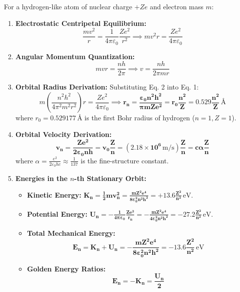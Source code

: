 \documentclass[10pt,a4paper]{article}
\begin{document}
\begin{formulabox}
For a hydrogen-like atom of nuclear charge $+Ze$ and electron mass $m$:
\begin{enumerate}
  \item \textbf{Electrostatic Centripetal Equilibrium:}
  \begin{equation}
    \frac{m v^2}{r} = \frac{1}{4\pi\varepsilon_0} \frac{Z e^2}{r^2} \implies m v^2 r = \frac{Z e^2}{4\pi\varepsilon_0} \tag{Eq. 1}
  \end{equation}
  \item \textbf{Angular Momentum Quantization:}
  \begin{equation}
    m v r = \frac{n h}{2\pi} \implies v = \frac{n h}{2\pi m r} \tag{Eq. 2}
  \end{equation}
  \item \textbf{Orbital Radius Derivation:} Substituting Eq. 2 into Eq. 1:
  \begin{equation}
    m \left(\frac{n^2 h^2}{4\pi^2 m^2 r^2}\right) r = \frac{Z e^2}{4\pi\varepsilon_0} \implies \mathbf{r_n = \frac{\varepsilon_0 n^2 h^2}{\pi m Z e^2} = r_0 \frac{n^2}{Z} = 0.529 \frac{n^2}{Z}\,\text{\AA}}
  \end{equation}
  where $r_0 = 0.529177\,\text{\AA}$ is the first Bohr radius of hydrogen ($n=1, Z=1$).
  \item \textbf{Orbital Velocity Derivation:}
  \begin{equation}
    \mathbf{v_n = \frac{Z e^2}{2\varepsilon_0 n h} = v_0 \frac{Z}{n} = \left(2.18 \times 10^6\,\mathrm{m/s}\right)\frac{Z}{n} = c \alpha \frac{Z}{n}}
  \end{equation}
  where $\alpha = \frac{e^2}{2\varepsilon_0 h c} \approx \frac{1}{137}$ is the fine-structure constant.
  \item \textbf{Energies in the $n$-th Stationary Orbit:}
  \begin{itemize}
    \item \textbf{Kinetic Energy:} $\mathbf{K_n = \frac{1}{2}m v_n^2 = \frac{m Z^2 e^4}{8\varepsilon_0^2 n^2 h^2} = +13.6 \frac{Z^2}{n^2}\,\mathrm{eV}}$.
    \item \textbf{Potential Energy:} $\mathbf{U_n = -\frac{1}{4\pi\varepsilon_0}\frac{Z e^2}{r_n} = -\frac{m Z^2 e^4}{4\varepsilon_0^2 n^2 h^2} = -27.2 \frac{Z^2}{n^2}\,\mathrm{eV}}$.
    \item \textbf{Total Mechanical Energy:}
    \begin{equation}
      \mathbf{E_n = K_n + U_n = -\frac{m Z^2 e^4}{8\varepsilon_0^2 n^2 h^2} = -13.6 \frac{Z^2}{n^2}\,\mathrm{eV}}
    \end{equation}
    \item \textbf{Golden Energy Ratios:}
    \begin{equation}
      \mathbf{E_n = -K_n = \frac{U_n}{2}}
    \end{equation}
  \end{itemize}
\end{enumerate}
\end{formulabox}
\end{document}
